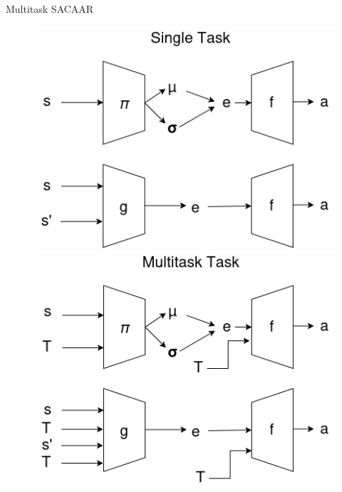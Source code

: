 \begin{frame}{Multitask SACAAR}
    \begin{figure}
        \begin{minipage}[t]{0.45\linewidth}
            \centering
            \vspace{0pt}
            \includegraphics[width=\textwidth]{img/single_task_sacaar.png}
        \end{minipage}
        \hspace{0.5cm}
        \begin{minipage}[t]{0.45\linewidth}
            \centering
            \vspace{0pt}
            \includegraphics[width=\textwidth]{img/multi_task_sacaar.png}
        \end{minipage}
    \end{figure}
\end{frame}
